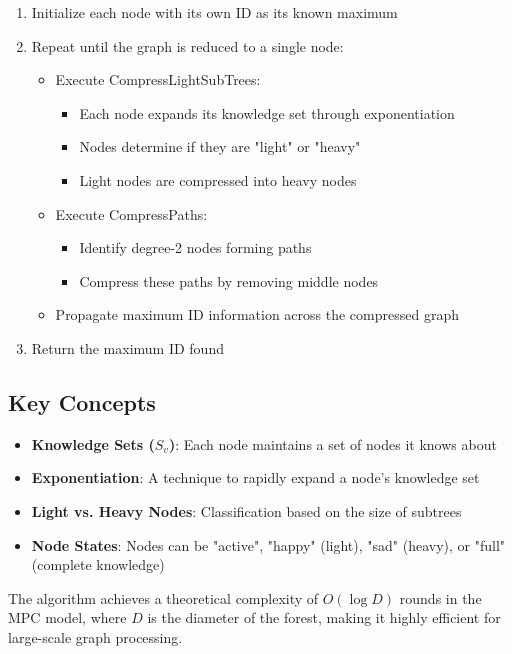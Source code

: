 \documentclass[11pt,a4paper]{article}
\begin{document}
\begin{enumerate}
    \item Initialize each node with its own ID as its known maximum
    \item Repeat until the graph is reduced to a single node:
    \begin{itemize}
        \item Execute CompressLightSubTrees:
        \begin{itemize}
            \item Each node expands its knowledge set through exponentiation
            \item Nodes determine if they are "light" or "heavy"
            \item Light nodes are compressed into heavy nodes
        \end{itemize}
        \item Execute CompressPaths:
        \begin{itemize}
            \item Identify degree-2 nodes forming paths
            \item Compress these paths by removing middle nodes
        \end{itemize}
        \item Propagate maximum ID information across the compressed graph
    \end{itemize}
    \item Return the maximum ID found
\end{enumerate}

\subsection{Key Concepts}

\begin{itemize}
    \item \textbf{Knowledge Sets ($S_v$)}: Each node maintains a set of nodes it knows about
    \item \textbf{Exponentiation}: A technique to rapidly expand a node's knowledge set
    \item \textbf{Light vs. Heavy Nodes}: Classification based on the size of subtrees
    \item \textbf{Node States}: Nodes can be "active", "happy" (light), "sad" (heavy), or "full" (complete knowledge)
\end{itemize}

The algorithm achieves a theoretical complexity of $O(\log D)$ rounds in the MPC model, where $D$ is the diameter of the forest, making it highly efficient for large-scale graph processing.
\end{document}
